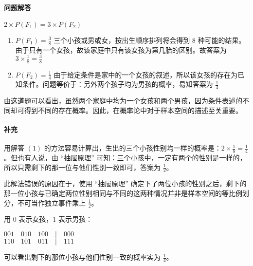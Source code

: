 		\paragraph{问题解答}
			$ 2 \times P(F_1) = 3 \times P(F_2) $
			\begin{enumerate}[\indent (1)]
				\item $ P(F_1) = \frac{3}{8} $
					\proof 三个小孩或男或女，按出生顺序排列将会得到 8 种可能的结果。由于只有一个女孩，故该家庭中只有该女孩为第几胎的区别。故答案为 $ 3 \times \frac{1}{8} = \frac{3}{8} $
				\item $ P(F_2) = \frac{1}{4} $
					\proof 由于给定条件是家中的一个女孩的叙述，所以该女孩的存在为已知条件。问题等价于：另外两个孩子均为男孩的概率，易知答案为 $ \frac{1}{4} $
			\end{enumerate}
		\remark
			由这道题可以看出，虽然两个家庭中均为一个女孩和两个男孩，因为条件表述的不同却可得到不同的存在概率。因此，在概率论中对于样本空间的描述至关重要。
		\paragraph{补充}
			 用解答 $ (1) $ 的方法容易计算出，生出的三个小孩性别均一样的概率是：$2 \times \frac{1}{8} = \frac{1}{4}$ 。但也有人说，由 “抽屉原理” 可知：三个小孩中，一定有两个的性别是一样的，所以只需剩下的那一位与他们性别一致即可，答案为 $\frac{1}{2}$。
			\par \quad 此解法错误的原因在于，使用 “抽屉原理” 确定下了两位小孩的性别之后，剩下的那一位小孩与已确定两位性别相同与不同的这两种情况并非是样本空间的等比例划分，不可当作独立事件乘上 $\frac{1}{2}$。
			\par 用 $0$ 表示女孩，$1$ 表示男孩：
			\begin{center}
				$ 001 \quad 010 \quad 100 \quad | \quad 000 $ \\
				$ 110 \quad 101 \quad 011 \quad | \quad 111 $
			\end{center}
			可以看出剩下的那位小孩与他们性别一致的概率实为 $\frac{1}{4}$。


